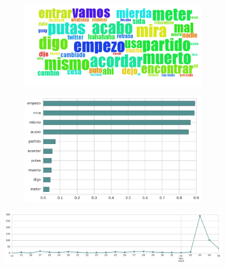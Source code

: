 \begin{figure}[htbp!]
    \centering
    \begin{subfigure}[b]{0.49\textwidth}
        \includegraphics[width=\textwidth]{twitter_all/report_images/topic-12-wordcloud.jpg}
    \end{subfigure}
    \begin{subfigure}[b]{0.49\textwidth}
        \includegraphics[width=\textwidth]{twitter_all/report_images/topic-12-terms.jpg}
    \end{subfigure}
\end{figure}

\begin{figure}[htbp!]
    \centering
    \includegraphics[width=\textwidth]{twitter_all/report_images/topic-12-timeseries.jpg}
\end{figure}

